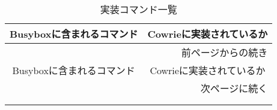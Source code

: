 \begin{longtable}{|c|c|}
  \caption{実装コマンド一覧}
  \label{table:command} \\
  \hline
  Busyboxに含まれるコマンド & Cowrieに実装されているか \\ \hline\hline
  \endfirsthead
  \multicolumn{3}{r}{前ページからの続き} \\ \hline
  Busyboxに含まれるコマンド & Cowrieに実装されているか \\ \hline\hline
  \endhead
  \hline
  \multicolumn{3}{r}{次ページに続く} \\
  \endfoot
  \hline
  \multicolumn{3}{r}{以上} \\
  \endlastfoot


\end{longtable}
